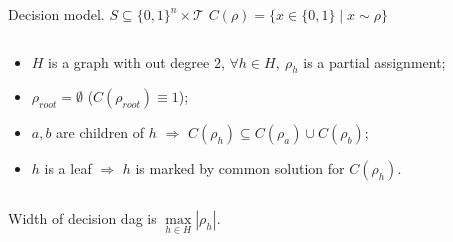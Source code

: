 \begin{frame}{Decision model. $S \subseteq \{0, 1\}^n \times \mathcal{T}$}
    $C(\rho) = \{x \in \{0, 1\} \mid x \sim \rho\}$
    
    \begin{columns}[t]
        \begin{column}{0.55\textwidth}
            \begin{itemize}
                \item $H$ is a graph with out degree $2$, $\forall h \in H, ~ {\rho}_h$ is a partial
                    assignment;
                \item $\rho_{root} = \emptyset$ ($C(\rho_{root}) \equiv 1$);
                \item $a, b$ are children of $h$ $\Rightarrow$ $C(\rho_{h}) \subseteq C(\rho_a) \cup
                    C(\rho_b)$;
                \item $h$ is a leaf $\Rightarrow$ $h$ is marked by common solution for $C(\rho_h)$.
            \end{itemize}
        \end{column}

		\begin{column}{0.4\textwidth}
            \begin{center}
                \vspace{0.2cm}
                
            \end{center}
		\end{column}
	\end{columns}

    Width of decision dag is $\max\limits_{h \in H} |\rho_h|$.
\end{frame}
